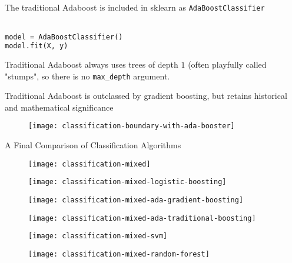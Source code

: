 %
\begin{frame}[fragile]
The traditional Adaboost is included in sklearn as \texttt{AdaBoostClassifier}\\~\\

\begin{lstlisting}[language=python]
model = AdaBoostClassifier()
model.fit(X, y)
\end{lstlisting}

Traditional Adaboost always uses trees of depth $1$ (often playfully called "stumps", so there is no \texttt{max\_depth} argument.
\end{frame}

%
\begin{frame}[fragile]
Traditional Adaboost is outclassed by gradient boosting, but retains historical and mathematical significance

  \begin{figure}
    \texttt{[image: classification-boundary-with-ada-booster]}
  \end{figure}
 
\end{frame}
%
\begin{frame}{A Final Comparison of Classification Algorithms}

  \begin{figure}
    \texttt{[image: classification-mixed]}
  \end{figure}

\end{frame}
%
\begin{frame}

  \begin{figure}
    \texttt{[image: classification-mixed-logistic-boosting]}
  \end{figure}
  
\end{frame}
%
\begin{frame}

  \begin{figure}
    \texttt{[image: classification-mixed-ada-gradient-boosting]}
  \end{figure}
  
\end{frame}
%
\begin{frame}

  \begin{figure}
    \texttt{[image: classification-mixed-ada-traditional-boosting]}
  \end{figure}
  
\end{frame}
%
\begin{frame}

  \begin{figure}
    \texttt{[image: classification-mixed-svm]}
  \end{figure}
  
\end{frame}
%
\begin{frame}

  \begin{figure}
    \texttt{[image: classification-mixed-random-forest]}
  \end{figure}
  
\end{frame}
